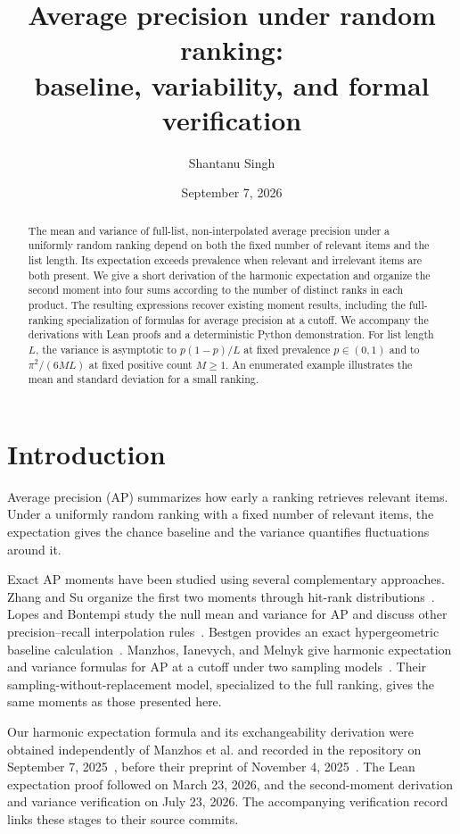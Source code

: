\documentclass[10pt]{article}
\title{Average precision under random ranking:\\baseline, variability, and formal verification}
\author{Shantanu Singh}
\date{September 7, 2026}
\begin{document}
\maketitle
\begin{abstract}
The mean and variance of full-list, non-interpolated average precision under a uniformly random ranking depend on both the fixed number of relevant items and the list length.
Its expectation exceeds prevalence when relevant and irrelevant items are both present.
We give a short derivation of the harmonic expectation and organize the second moment into four sums according to the number of distinct ranks in each product.
The resulting expressions recover existing moment results, including the full-ranking specialization of formulas for average precision at a cutoff.
We accompany the derivations with Lean proofs and a deterministic Python demonstration.
For list length $L$, the variance is asymptotic to $p(1-p)/L$ at fixed prevalence $p\in(0,1)$ and to $\pi^2/(6ML)$ at fixed positive count $M\ge1$.
An enumerated example illustrates the mean and standard deviation for a small ranking.
\end{abstract}

\section{Introduction}
Average precision (AP) summarizes how early a ranking retrieves relevant items.
Under a uniformly random ranking with a fixed number of relevant items, the expectation gives the chance baseline and the variance quantifies fluctuations around it.

Exact AP moments have been studied using several complementary approaches.
Zhang and Su organize the first two moments through hit-rank distributions~\cite{zhang}.
Lopes and Bontempi study the null mean and variance for AP and discuss other precision--recall interpolation rules~\cite{lopes}.
Bestgen provides an exact hypergeometric baseline calculation~\cite{bestgen}.
Manzhos, Ianevych, and Melnyk give harmonic expectation and variance formulas for AP at a cutoff under two sampling models~\cite{manzhos}.
Their sampling-without-replacement model, specialized to the full ranking, gives the same moments as those presented here.

Our harmonic expectation formula and its exchangeability derivation were obtained independently of Manzhos et al. and recorded in the repository on September 7, 2025~\cite{early}, before their preprint of November 4, 2025~\cite{manzhos}.
The Lean expectation proof followed on March 23, 2026, and the second-moment derivation and variance verification on July 23, 2026.
The accompanying verification record links these stages to their source commits.
\end{document}
